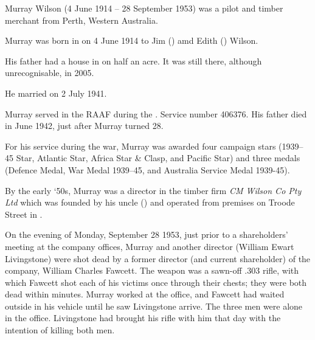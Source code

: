 
Murray Wilson (4 June 1914 -- 28 September 1953) was a pilot and timber merchant from Perth, Western Australia.

Murray was born in \cite{WABMD208} on 4 June 1914 to Jim () amd Edith () Wilson.

His father had a house in  on half an acre. It was still there, although unrecognisable, in 2005.

He married  on 2 July 1941.\cite{MurrayMargMarriageNotice}

Murray served in the RAAF during the . Service number 406376.\cite{NAAA9300}
His father died in June 1942, just after Murray turned 28.

For his service during the war, Murray was awarded\cite{RMWDeptAirLetter} four campaign stars
(1939--45 Star, Atlantic Star, Africa Star \& Clasp, and Pacific Star)
and three medals (Defence Medal, War Medal 1939--45, and Australia Service Medal 1939-45).


By the early `50s, Murray was a director in the timber firm \emph{CM Wilson Co Pty Ltd}
which was founded by his uncle ()
and operated from premises on Troode Street in .\cite{CompanyChiefs}

On the evening of Monday, September 28 1953,\cite{WADeaths, WestAusDeathNotices, VictimEstate}
just prior to a shareholders' meeting at the company offices, Murray and another director (William Ewart Livingstone)
were shot dead by a former director\cite{InsanityVerdict} (and current shareholder) of the company, William Charles Fawcett.
The weapon was a sawn-off .303 rifle,\cite{GuiltyInsane, CompanyChiefs, TimberDirectors} with which Fawcett
shot each of his victims once through their chests; they were both dead within minutes.\cite{CompanyChiefs}
Murray worked at the office, and Fawcett had waited outside in his vehicle until he saw Livingstone arrive.\cite{MurderDirectors}
The three men were alone in the office.\cite{NewAngle}
Livingstone had brought his rifle with him that day with the intention of killing both men.\cite{DoubleMurder}

